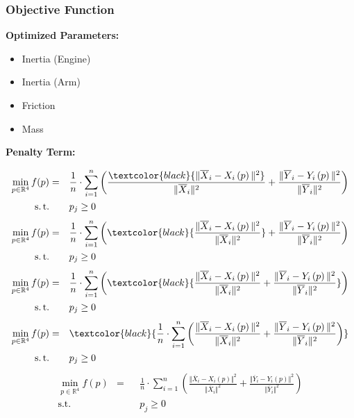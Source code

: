 \begin{frame}[c]
	\frametitle{Objective Function}
		\textbf{Optimized Parameters:}
		\begin{itemize}
			\item{Inertia (Engine)}
			\item{Inertia (Arm)}
			\item{Friction}
			\item{Mass}
		\end{itemize}
	
		\vspace{.5cm}
	
		\textbf{Penalty Term:}
		\vspace{-.5cm}
		\textcolor{white}{
		\begin{overprint}
				\begin{align*}
					\min_{p\in\mathbb{R}^4}f(p) & = & & \frac 1 n \cdot \sum_{i=1}^{n}\left(\frac{\textcolor{black}{\Vert \overline{X}_i - X_i \left(p\right)\Vert^2}}{\Vert \overline{X}_i\Vert^2} + \frac{\Vert \overline{Y}_i - Y_i \left(p\right)\Vert^2}{\Vert \overline{Y}_i\Vert^2}\right) \\
					\operatorname{s.t.} & & & p_j \geq 0
				\end{align*}
			\onslide<3>
				\begin{align*}
					\min_{p\in\mathbb{R}^4}f(p) & = & & \frac 1 n \cdot \sum_{i=1}^{n}\left(\textcolor{black}{\frac{\Vert \overline{X}_i - X_i \left(p\right)\Vert^2}{\Vert \overline{X}_i\Vert^2}} + \frac{\Vert \overline{Y}_i - Y_i \left(p\right)\Vert^2}{\Vert \overline{Y}_i\Vert^2}\right) \\
					\operatorname{s.t.} & & & p_j \geq 0
				\end{align*}
			\onslide<4>
				\begin{align*}
					\min_{p\in\mathbb{R}^4}f(p) & = & & \frac 1 n \cdot \sum_{i=1}^{n}\left(\textcolor{black}{\frac{\Vert \overline{X}_i - X_i \left(p\right)\Vert^2}{\Vert \overline{X}_i\Vert^2} + \frac{\Vert \overline{Y}_i - Y_i \left(p\right)\Vert^2}{\Vert \overline{Y}_i\Vert^2}}\right) \\
					\operatorname{s.t.} & & & p_j \geq 0
				\end{align*}	
			\onslide<5>
				\begin{align*}
					\min_{p\in\mathbb{R}^4}f(p) & = & & \textcolor{black}{\frac 1 n \cdot \sum_{i=1}^{n}\left(\frac{\Vert \overline{X}_i - X_i \left(p\right)\Vert^2}{\Vert \overline{X}_i\Vert^2} + \frac{\Vert \overline{Y}_i - Y_i \left(p\right)\Vert^2}{\Vert \overline{Y}_i\Vert^2}\right)} \\
					\operatorname{s.t.} & & & p_j \geq 0
				\end{align*}
			\onslide<6->
				\textcolor{black}{
				\begin{align*}
					\min_{p\in\mathbb{R}^4}f(p) & = & & \frac 1 n \cdot \sum_{i=1}^{n}\left(\frac{\Vert \overline{X}_i - X_i \left(p\right)\Vert^2}{\Vert \overline{X}_i\Vert^2} + \frac{\Vert \overline{Y}_i - Y_i \left(p\right)\Vert^2}{\Vert \overline{Y}_i\Vert^2}\right) \\
					\operatorname{s.t.} & & & p_j \geq 0
				\end{align*}}
		\end{overprint}}
	

\end{frame}
